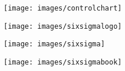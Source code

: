 \documentclass[MAIN.tex]{subfiles}
\begin{document}
\begin{frame}
	\begin{figure}
\centering
\texttt{[image: images/controlchart]}
\end{figure}
\end{frame}

\begin{frame}
	
\begin{figure}
\centering
\texttt{[image: images/sixsigmalogo]}

\end{figure}

\end{frame}

\begin{frame}
	\begin{figure}
\centering
\texttt{[image: images/sixsigma]}
\end{figure}

	
	
\end{frame}

\begin{frame}

\begin{figure}
\centering
\texttt{[image: images/sixsigmabook]}

\end{figure}

\end{frame}
\end{document}
